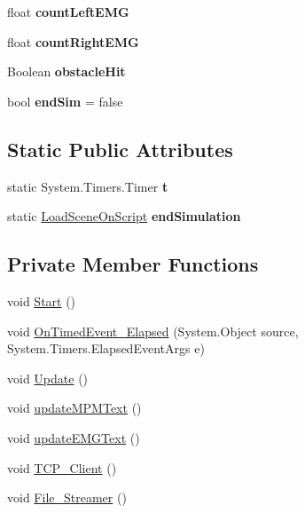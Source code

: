 \begin{DoxyCompactItemize}
float {\bfseries count\+Left\+E\+MG}
\item 
\mbox{\label{class_movement_controller_ab7d732620e293a363a5b46ed7dd977f3}} 
float {\bfseries count\+Right\+E\+MG}
\item 
\mbox{\label{class_movement_controller_aa5e594139d89e83c012dcb013c55f163}} 
Boolean {\bfseries obstacle\+Hit}
\item 
\mbox{\label{class_movement_controller_abe37faad562603b0e3124ef1335e7325}} 
bool {\bfseries end\+Sim} = false
\end{DoxyCompactItemize}
\subsection*{Static Public Attributes}
\begin{DoxyCompactItemize}
\item 
\mbox{\label{class_movement_controller_a27b2def4f884db9ba74d7d62fe789573}} 
static System.\+Timers.\+Timer {\bfseries t}
\item 
\mbox{\label{class_movement_controller_a2a6a4b0ea88299286e99abe025a3701a}} 
static \hyperlink{class_load_scene_on_script}{Load\+Scene\+On\+Script} {\bfseries end\+Simulation}
\end{DoxyCompactItemize}
\subsection*{Private Member Functions}
\begin{DoxyCompactItemize}
\item 
void \hyperlink{class_movement_controller_a6625f01290af846b3b61ea1e1432fb19}{Start} ()
\item 
void \hyperlink{class_movement_controller_a60a8ed424efc24c04354f4741ed184c9}{On\+Timed\+Event\+\_\+\+Elapsed} (System.\+Object source, System.\+Timers.\+Elapsed\+Event\+Args e)
\item 
void \hyperlink{class_movement_controller_a380c48ddf4dadb2df3d58cad2f6718a7}{Update} ()
\item 
void \hyperlink{class_movement_controller_abe71887d2658d9031b2b11ae2f48f810}{update\+M\+P\+M\+Text} ()
\item 
void \hyperlink{class_movement_controller_afd47400566c9ec385c6cb19574de283e}{update\+E\+M\+G\+Text} ()
\item 
void \hyperlink{class_movement_controller_a6617aa6bca661e3ccdf0412d8dab2dc2}{T\+C\+P\+\_\+\+Client} ()
\item 
void \hyperlink{class_movement_controller_a7df00ba99e9eb0a7c55fb9724e6bec1d}{File\+\_\+\+Streamer} ()
\end{DoxyCompactItemize}
